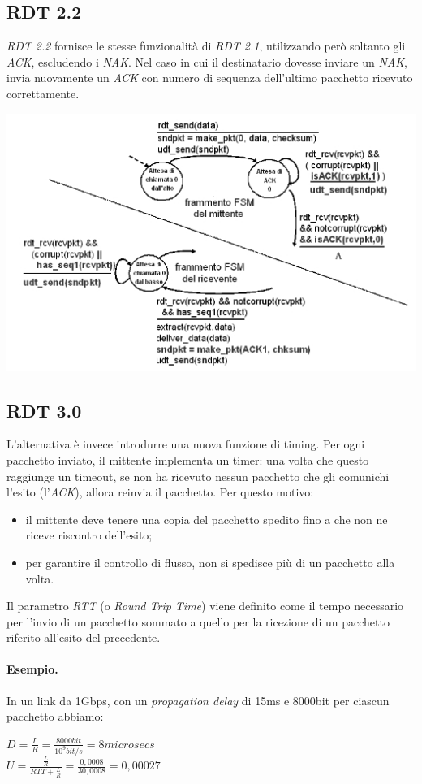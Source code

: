\subsection{RDT 2.2}
\textit{RDT 2.2} fornisce le stesse funzionalità di \textit{RDT 2.1}, utilizzando però soltanto gli \textit{ACK}, escludendo i \textit{NAK}.
Nel caso in cui il destinatario dovesse inviare un \textit{NAK}, invia nuovamente un \textit{ACK} con numero di sequenza dell'ultimo pacchetto ricevuto correttamente.
\begin{center}
    \includegraphics[width=.7\textwidth]{res/fsm-rdt-22.jpg} \hfill
\end{center}

\subsection{RDT 3.0}
L'alternativa è invece introdurre una nuova funzione di timing. Per ogni pacchetto inviato, il mittente implementa un timer: una volta che questo raggiunge un timeout, se non ha ricevuto nessun pacchetto che gli comunichi l'esito (l'\textit{ACK}), allora reinvia il pacchetto. Per questo motivo:
\begin{itemize}
    \item il mittente deve tenere una copia del pacchetto spedito fino a che non ne riceve riscontro dell'esito;
    \item per garantire il controllo di flusso, non si spedisce più di un pacchetto alla volta.
\end{itemize}
Il parametro \textit{RTT} (o \textit{Round Trip Time}) viene definito come il tempo necessario per l'invio di un pacchetto sommato a quello per la ricezione di un pacchetto riferito all'esito del precedente.
\paragraph{Esempio.}
In un link da 1Gbps, con un \textit{propagation delay} di 15ms e 8000bit per ciascun pacchetto abbiamo:
\begin{center}
$ D = \frac{L}{R} = \frac{8000bit}{10^9 bit/s} = 8microsecs $ \\
$ U = \frac{\frac{L}{R}}{RTT + \frac{L}{R}} = \frac{0,0008}{30,0008} = 0,00027 $
\end{center}
\newpage

